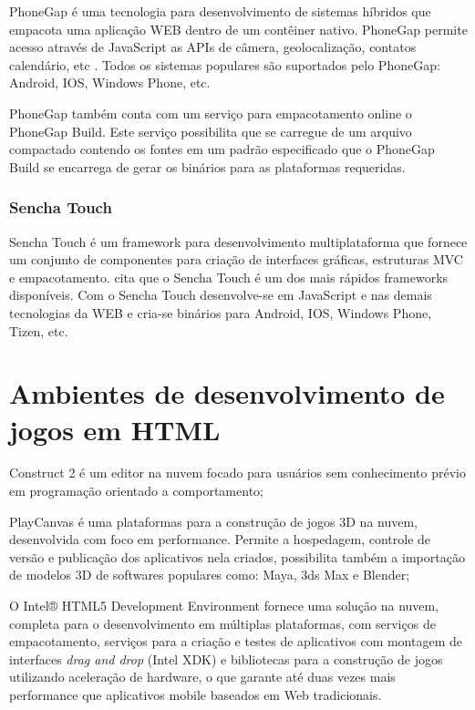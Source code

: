 PhoneGap é uma tecnologia para desenvolvimento de sistemas híbridos 
que empacota uma aplicação WEB dentro de um contêiner nativo. PhoneGap 
permite acesso através de JavaScript as APIs de câmera, geolocalização,
contatos calendário, etc \autocite[pp. 3]{crossPlatformAppsAnimations}.
Todos os sistemas populares são suportados pelo PhoneGap: Android, IOS,
Windows Phone, etc.

PhoneGap também conta com um serviço para empacotamento online
o PhoneGap Build. Este serviço possibilita que se carregue de um
arquivo compactado contendo os fontes em um padrão especificado 
que o PhoneGap Build  se encarrega de gerar os binários para as 
plataformas requeridas.

\subsection{Sencha Touch}
Sencha Touch é um framework para desenvolvimento multiplataforma
que fornece um conjunto de componentes para criação de
interfaces gráficas, estruturas MVC e empacotamento. \cite[pp.
14]{viabilityBusinessApplications} cita que o Sencha Touch é um dos
mais rápidos frameworks disponíveis. Com o Sencha Touch desenvolve-se
em JavaScript e nas demais tecnologias da WEB e cria-se binários para
Android, IOS, Windows Phone, Tizen, etc.


\chapter{Ambientes de desenvolvimento de jogos em HTML}

Construct 2 é um editor na nuvem focado para usuários sem
conhecimento prévio em programação orientado a comportamento;

PlayCanvas é uma plataformas para a construção de jogos 3D
na nuvem, desenvolvida com foco em performance. Permite a hospedagem,
controle de versão e publicação dos aplicativos nela criados,
possibilita também a importação de modelos 3D de softwares populares
como: Maya, 3ds Max e Blender;

O Intel® HTML5 Development Environment fornece uma solução na nuvem,
completa para o desenvolvimento em múltiplas plataformas, com serviços de
empacotamento, serviços para a criação e testes de aplicativos com
montagem de interfaces \textit{drag and drop} (Intel XDK) e bibliotecas
para a construção de jogos utilizando aceleração de hardware, o que
garante até duas vezes mais performance que aplicativos mobile baseados
em Web tradicionais.

